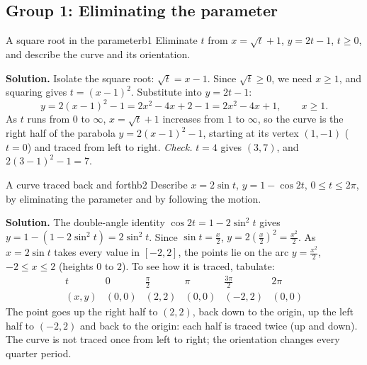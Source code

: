 \documentclass[11pt]{article}
\begin{document}
\subsection*{Group 1: Eliminating the parameter}

\begin{exmp}{A square root in the parameter}{b1}
Eliminate $t$ from $x=\sqrt t+1$, $y=2t-1$, $t\ge0$, and describe the curve and its orientation.

\textbf{Solution.} Isolate the square root: $\sqrt t=x-1$. Since $\sqrt t\ge0$, we need $x\ge1$, and squaring gives $t=(x-1)^2$. Substitute into $y=2t-1$:
\[
y=2(x-1)^2-1=2x^2-4x+2-1=2x^2-4x+1,\qquad x\ge1.
\]
As $t$ runs from $0$ to $\infty$, $x=\sqrt t+1$ increases from $1$ to $\infty$, so the curve is the right half of the parabola $y=2(x-1)^2-1$, starting at its vertex $(1,-1)$ ($t=0$) and traced from left to right. \emph{Check.} $t=4$ gives $(3,7)$, and $2(3-1)^2-1=7$.
\end{exmp}

\begin{exmp}{A curve traced back and forth}{b2}
Describe $x=2\sin t$, $y=1-\cos2t$, $0\le t\le2\pi$, by eliminating the parameter and by following the motion.

\textbf{Solution.} The double-angle identity $\cos2t=1-2\sin^2t$ gives $y=1-(1-2\sin^2t)=2\sin^2t$. Since $\sin t=\frac x2$, $y=2\left(\frac x2\right)^2=\frac{x^2}2$. As $x=2\sin t$ takes every value in $[-2,2]$, the points lie on the arc $y=\frac{x^2}2$, $-2\le x\le2$ (heights $0$ to $2$). To see how it is traced, tabulate:
\[
\begin{array}{c|ccccc}
t&0&\frac\pi2&\pi&\frac{3\pi}2&2\pi\\\hline
(x,y)&(0,0)&(2,2)&(0,0)&(-2,2)&(0,0)
\end{array}
\]
The point goes up the right half to $(2,2)$, back down to the origin, up the left half to $(-2,2)$ and back to the origin: each half is traced twice (up and down). The curve is not traced once from left to right; the orientation changes every quarter period.
\end{exmp}
\end{document}

